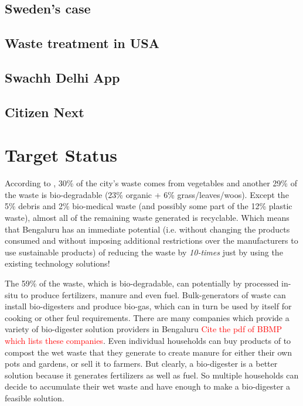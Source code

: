 \documentclass[10pt]{article}
\begin{document}
\subsection{Sweden's case}

\subsection{Waste treatment in USA}

\subsection{Swachh Delhi App}

\subsection{Citizen Next}


\section{Target Status}

According to \cite{BBMP:cityStatistics}, 30\% of the city's waste comes from vegetables and another 29\% of the waste is bio-degradable (23\% organic + 6\% grass/leaves/woos). Except the 5\% debris and 2\% bio-medical waste (and possibly some part of the 12\% plastic waste), almost all of the remaining waste generated is recyclable. Which means that Bengaluru has an immediate potential (i.e. without changing the products consumed and without imposing additional restrictions over the manufacturers to use sustainable products) of reducing the waste by \emph{10-times} just by using the existing technology solutions!

The 59\% of the waste, which is bio-degradable, can potentially by processed in-situ to produce fertilizers, manure and even fuel. Bulk-generators of waste can install bio-digesters and produce bio-gas, which can in turn be used by itself for cooking or other feul requirements. There are many companies which provide a variety of bio-digester solution providers in Bengaluru \textcolor{red}{Cite the pdf of BBMP which lists these companies}. Even individual households can buy products of \cite{DailyDump:about} to compost the wet waste that they generate to create manure for either their own pots and gardens, or sell it to farmers. But clearly, a bio-digester is a better solution because it generates fertilizers as well as fuel. So multiple households can decide to accumulate their wet waste and have enough to make a bio-digester a feasible solution.
\end{document}
